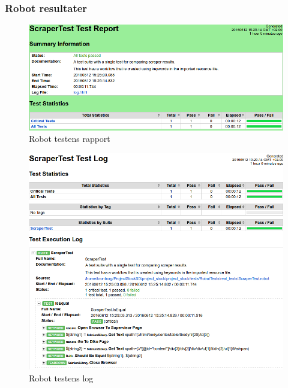 \documentclass[12pt]{article}
\begin{document}
\begin{center}
\subsubsection*{Robot resultater}
    \begin{figure}[H]
        \centering
        \includegraphics[scale=0.5]{report.png}
        \caption{Robot testens rapport}
        \label{fig:robot report}
    \end{figure}
    \begin{figure}[H]
        \centering
        \includegraphics[scale=0.5]{log.png}
        \caption{Robot testens log}
        \label{fig:robot log}
    \end{figure}
\end{center}
\end{document}
